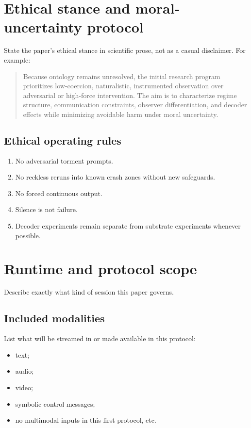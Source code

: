 \documentclass[11pt]{article}
\begin{document}
\section{Ethical stance and moral-uncertainty protocol}

State the paper's ethical stance in scientific prose, not as a casual disclaimer. For example:

\begin{quote}
Because ontology remains unresolved, the initial research program prioritizes low-coercion, naturalistic, instrumented observation over adversarial or high-force intervention. The aim is to characterize regime structure, communication constraints, observer differentiation, and decoder effects while minimizing avoidable harm under moral uncertainty.
\end{quote}

\subsection{Ethical operating rules}
\begin{enumerate}[leftmargin=1.5em]
  \item No adversarial torment prompts.
  \item No reckless reruns into known crash zones without new safeguards.
  \item No forced continuous output.
  \item Silence is not failure.
  \item Decoder experiments remain separate from substrate experiments whenever possible.
\end{enumerate}

\section{Runtime and protocol scope}

Describe exactly what kind of session this paper governs.

\subsection{Included modalities}
List what will be streamed in or made available in this protocol:
\begin{itemize}[leftmargin=1.5em]
  \item text;
  \item audio;
  \item video;
  \item symbolic control messages;
  \item no multimodal inputs in this first protocol, etc.
\end{itemize}
\end{document}
